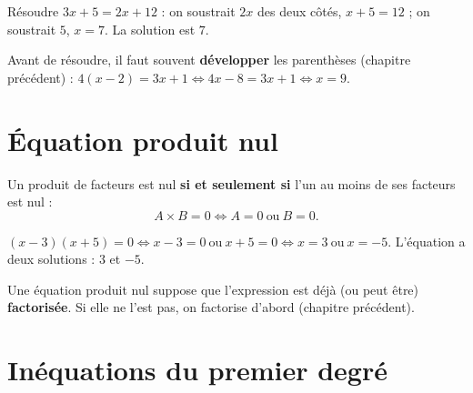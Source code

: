 \begin{exemple}
Résoudre $3x+5=2x+12$ : on soustrait $2x$ des deux côtés, $x+5=12$ ; on soustrait $5$,
$x=7$. La solution est $7$.
\end{exemple}

\begin{remarque}
Avant de résoudre, il faut souvent \textbf{développer} les parenthèses (chapitre précédent) :
$4(x-2)=3x+1 \iff 4x-8=3x+1 \iff x=9$.
\end{remarque}

\section{Équation produit nul}

\begin{propriete}
Un produit de facteurs est nul \textbf{si et seulement si} l'un au moins de ses facteurs est
nul :
\[
A\times B=0 \iff A=0 \ \text{ou}\ B=0.
\]
\end{propriete}

\begin{illus}
\end{illus}

\begin{exemple}
$(x-3)(x+5)=0 \iff x-3=0\ \text{ou}\ x+5=0 \iff x=3\ \text{ou}\ x=-5$. L'équation a deux
solutions : $3$ et $-5$.
\end{exemple}

\begin{remarque}
Une équation produit nul suppose que l'expression est déjà (ou peut être) \textbf{factorisée}.
Si elle ne l'est pas, on factorise d'abord (chapitre précédent).
\end{remarque}

\section{Inéquations du premier degré}

